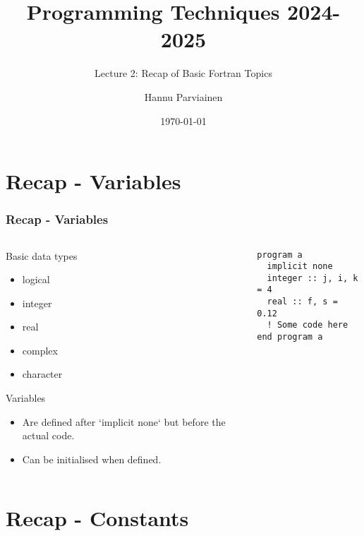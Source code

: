 \documentclass[10pt]{beamer}
\title{Programming Techniques 2024-2025}
\subtitle{Lecture 2: Recap of Basic Fortran Topics}
\author{Hannu Parviainen}
\institute{Universidad de la Laguna}
\date{\today}
\begin{document}
\begin{frame}
  \titlepage
\end{frame}

\section{Recap - Variables}

\begin{frame}[fragile]
  \frametitle{Recap - Variables}
  \begin{columns}[T]
    \begin{column}{0.5\textwidth}
    \begin{block}{Basic data types}
      \begin{itemize}
          \item logical
          \item integer
          \item real
          \item complex
          \item character
      \end{itemize}
    \end{block}

    \begin{block}{Variables}
      \begin{itemize}
        \item Are defined after `implicit none` but before the actual code.
        \item Can be initialised when defined.
      \end{itemize}        
    \end{block}
    \end{column}
    
    \begin{column}{0.5\textwidth}
      \begin{lstlisting}
program a
  implicit none
  integer :: j, i, k = 4
  real :: f, s = 0.12
  ! Some code here
end program a
      \end{lstlisting}
    \end{column}
  \end{columns}
\end{frame}

\section{Recap - Constants}
\end{document}
